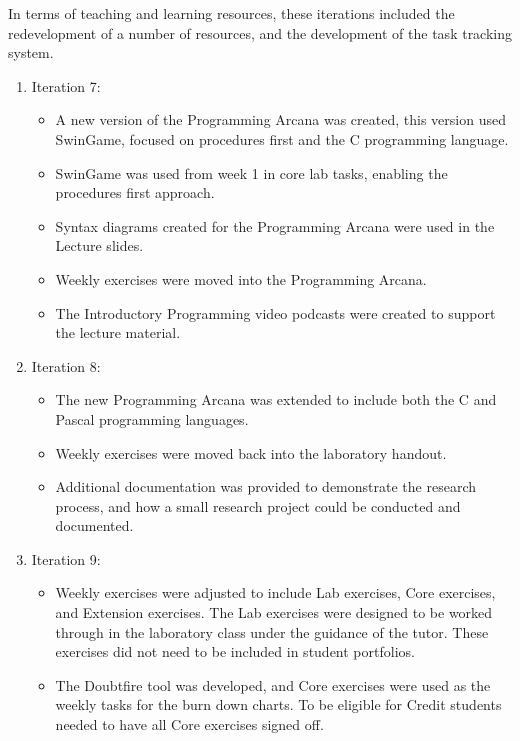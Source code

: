 In terms of teaching and learning resources, these iterations included the redevelopment of a number of resources, and the development of the task tracking system.

\begin{enumerate}
  \item Iteration 7: 
  \begin{itemize}[noitemsep,nolistsep]
  	\item A new version of the Programming Arcana was created, this version used SwinGame, focused on procedures first and the C programming language.
  	\item SwinGame was used from week 1 in core lab tasks, enabling the procedures first approach.
  	\item Syntax diagrams created for the Programming Arcana were used in the Lecture slides.
  	\item Weekly exercises were moved into the Programming Arcana.
  	\item The Introductory Programming video podcasts were created to support the lecture material.
  \end{itemize}

  \item Iteration 8:
  \begin{itemize}[noitemsep,nolistsep]
  	\item The new Programming Arcana was extended to include both the C and Pascal programming languages.
  	\item Weekly exercises were moved back into the laboratory handout.
  	\item Additional documentation was provided to demonstrate the research process, and how a small research project could be conducted and documented.
  \end{itemize}

  \item Iteration 9:
  \begin{itemize}[noitemsep,nolistsep]
  	\item Weekly exercises were adjusted to include Lab exercises, Core exercises, and Extension exercises. The Lab exercises were designed to be worked through in the laboratory class under the guidance of the tutor. These exercises did not need to be included in student portfolios.
  	\item The Doubtfire tool was developed, and Core exercises were used as the weekly tasks for the burn down charts. To be eligible for Credit students needed to have all Core exercises signed off.
  \end{itemize}
\end{enumerate}


